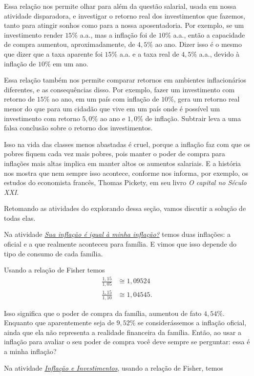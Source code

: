 Essa relação nos permite olhar para além da questão salarial, usada em nossa atividade disparadora, e investigar o retorno real dos investimentos que fazemos, tanto para atingir sonhos como para a nossa aposentadoria. Por exemplo, se um investimento render $15$\% a.a., mas a inflação foi de $10$\% a.a., então a capacidade de compra aumentou, aproximadamente, de $4{,}5$\% ao ano. Dizer isso é o mesmo que dizer que a taxa aparente foi $15$\% a.a. e a taxa real de $4{,}5$\% a.a., devido à inflação de $10$\% em um ano.

Essa relação também nos permite comparar retornos em ambientes inflacionários diferentes, e as consequências disso. Por exemplo, fazer um investimento com retorno de $15\%$ ao ano, em um país com inflação de $10\%$, gera um retorno real menor do que para um cidadão que vive em um país onde é possível um investimento com retorno $5{,}0\%$ ao ano e $1{,}0\%$ de inflação. Subtrair leva a uma falsa conclusão sobre o retorno dos investimentos. 

Isso na vida das classes menos abastadas é cruel, porque a inflação faz com que os pobres fiquem cada vez mais pobres, pois manter o poder de compra para inflações mais altas implica em manter altos os aumentos salariais. E a história nos mostra que nem sempre isso acontece, conforme nos informa, por exemplo, os estudos do economista francês, Thomas Pickety, em seu livro \textit{O capital no Século XXI}.

Retomando as atividades do explorando dessa seção, vamos discutir a solução de todas elas.

Na atividade \hyperref[sua-inflacao]{\textit{Sua inflação é igual à minha inflação?}} temos duas inflações: a oficial e a que realmente aconteceu para família. E vimos que isso depende do tipo de consumo de cada família. 

Usando a relação de Fisher temos
\begin{align*}
\frac{1{,}15}{1{,}05}&\cong1{,}09524\\
\frac{1{,}15}{1{,}10}&\cong1{,}04545.
\end{align*}

Isso significa que o poder de compra da família, aumentou de fato $4{,}54\%$. Enquanto que aparentemente seja de $9{,}52\%$ se considerássemos a inflação oficial, ainda que ela não representa a realidade financeira da família. Então, ao usar a inflação para avaliar o seu poder de compra você deve sempre se perguntar: essa é a minha inflação? 

Na atividade \hyperref[inflacao-investimentos]{\textit{Inflação e Investimentos}}, usando a relação de Fisher, temos

